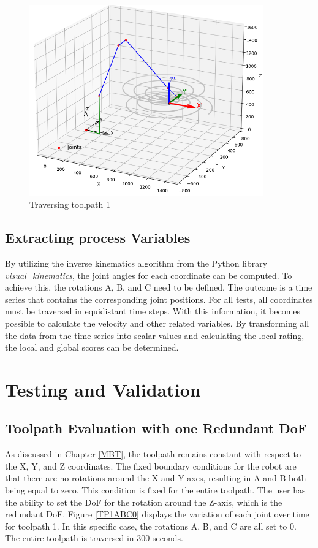 \begin{figure}[H]
	\centerline{\includegraphics[width=0.9\textwidth]{figures/robotANDpath1.png}}
	\caption{Traversing toolpath 1}
	\label{TP1robot}
\end{figure}




\subsection{Extracting process Variables}
By utilizing the inverse kinematics algorithm from the Python library \textit{visual\_kinematics}, the joint angles for each coordinate can be computed. To achieve this, the rotations A, B, and C need to be defined. The outcome is a time series that contains the corresponding joint positions. For all tests, all coordinates must be traversed in equidistant time steps. With this information, it becomes possible to calculate the velocity and other related variables. By transforming all the data from the time series into scalar values and calculating the local rating, the local and global scores can be determined.
\newpage
\section{Testing and Validation}%

\subsection{Toolpath Evaluation with one Redundant DoF}
As discussed in Chapter \ref{MBT}, the toolpath remains constant with respect to the X, Y, and Z coordinates. The fixed boundary conditions for the robot are that there are no rotations around the X and Y axes, resulting in A and B both being equal to zero. This condition is fixed for the entire toolpath. The user has the ability to set the \acrshort{DoF} for the rotation around the Z-axis, which is the redundant \acrshort{DoF}. Figure \ref{TP1ABC0} displays the variation of each joint over time for toolpath 1. In this specific case, the rotations A, B, and C are all set to 0. The entire toolpath is traversed in 300 seconds.

